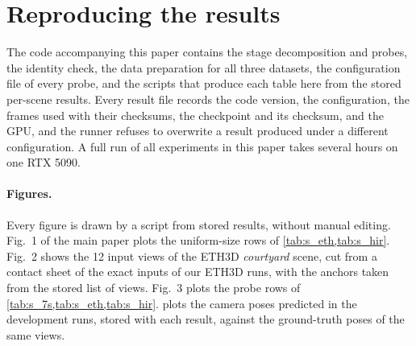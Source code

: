 \documentclass[10pt,twocolumn,letterpaper]{article}
\begin{document}
\section{Reproducing the results}
\label{sec:s_repro}

The code accompanying this paper contains the stage decomposition and probes, the identity check, the data preparation for all three datasets, the configuration file of every probe, and the scripts that produce each table here from the stored per-scene results. Every result file records the code version, the configuration, the frames used with their checksums, the checkpoint and its checksum, and the GPU, and the runner refuses to overwrite a result produced under a different configuration. A full run of all experiments in this paper takes several hours on one RTX 5090.

\paragraph{Figures.}
Every figure is drawn by a script from stored results, without manual editing. Fig.~1 of the main paper plots the uniform-size rows of \cref{tab:s_eth,tab:s_hir}. Fig.~2 shows the 12 input views of the ETH3D \emph{courtyard} scene, cut from a contact sheet of the exact inputs of our ETH3D runs, with the anchors taken from the stored list of views. Fig.~3 plots the probe rows of \cref{tab:s_7s,tab:s_eth,tab:s_hir}.  plots the camera poses predicted in the development runs, stored with each result, against the ground-truth poses of the same views.
\end{document}

